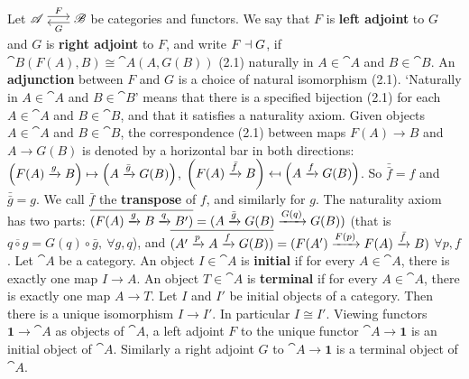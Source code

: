 Let $\cat A \isofuncs{F}{G} \cat B$ be categories and functors. We say that $F$ is \textbf{left adjoint} to $G$ and $G$ is \textbf{right adjoint} to $F$, and write $F \dashv G$, if $\cat B(F(A), B) \cong \cat A(A, G(B))$ (2.1) naturally in $A \in \cat A$ and $B \in \cat B$. An \textbf{adjunction} between $F$ and $G$ is a choice of natural isomorphism (2.1). `Naturally in $A \in \cat A$ and $B \in \cat B$' means that there is a specified bijection (2.1) for each $A \in \cat A$ and $B \in \cat B$, and that it satisfies a naturality axiom. 
 Given objects $A \in \cat A$ and $B \in \cat B$, the correspondence (2.1) between maps $F(A) \to B$ and $A \to G(B)$ is denoted by a horizontal bar in both directions: $\left(F(A) \xrightarrow[]{g} B\right) \mapsto \left(A \xrightarrow[]{\bar{g}} G(B)\right)$, $\left(F(A) \xrightarrow[]{\bar{f}} B\right) \mapsfrom \left(A \xrightarrow[]{f} G(B)\right)$. So $\bar{\bar{f}} = f$ and $\bar{\bar{g}} = g$. We call $\bar{f}$ the \textbf{transpose} of $f$, and similarly for $g$. 
 The naturality axiom has two parts: $\overline{(F(A) \xrightarrow[]{g} B \xrightarrow[]{q} B')} = (A \xrightarrow[]{\bar{g}} G(B) \xrightarrow[]{G(q)} G(B))$ (that is $\overline{q \circ g} = G(q) \circ \bar{g},\ \forall g,q$), and $\overline{(A' \xrightarrow[]{p} A \xrightarrow[]{f} G(B))} = (F(A') \xrightarrow[]{F(p)} F(A) \xrightarrow[]{\bar{f}} B)$ $\forall p,f$.
 Let $\cat A$ be a category. An object $I \in \cat A$ is \textbf{initial} if for every $A \in \cat A$, there is exactly one map $I \to A$. An object $T \in \cat A$ is \textbf{terminal} if for every $A \in \cat A$, there is exactly one map $A \to T$.
 Let $I$ and $I'$ be initial objects of a category. Then there is a unique isomorphism $I \to I'$. In particular $I \cong I'$.
 Viewing functors $\mathbf{1} \to \cat A$ as objects of $\cat A$, a left adjoint $F$ to the unique functor $\cat A \to \mathbf{1}$ is an initial object of $\cat A$. Similarly a right adjoint $G$ to $\cat A \to \mathbf{1}$ is a terminal object of $\cat A$.